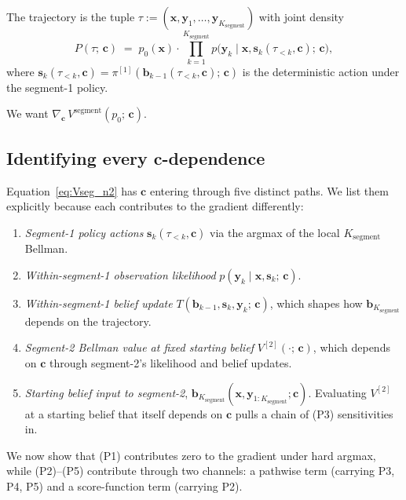 \documentclass[11pt,a4paper]{article}
\newcommand{\bc}{\bm{c}}
\newcommand{\bx}{\bm{x}}
\newcommand{\by}{\bm{y}}
\newcommand{\bs}{\bm{s}}
\newcommand{\bb}{\bm{b}}
\begin{document}
The trajectory is the tuple $\tau := (\bx, \by_1, \ldots, \by_{K_\mathrm{segment}})$ with
joint density
\begin{equation}
P(\tau;\, \bc) \;=\; p_0(\bx) \cdot \prod_{k=1}^{K_\mathrm{segment}} p\bigl(\by_k \mid \bx, \bs_k(\tau_{<k}, \bc);\, \bc\bigr),
\label{eq:trajdensity}
\end{equation}
where $\bs_k(\tau_{<k}, \bc) = \pi^{[1]}(\bb_{k-1}(\tau_{<k}, \bc);\, \bc)$ is the
deterministic action under the segment-1 policy.

We want $\nabla_{\bc}\, V^\mathrm{segment}(p_0;\, \bc)$.

\subsection{Identifying every \texorpdfstring{$\bc$}{c}-dependence}
\label{sec:c_dependences}

Equation~\eqref{eq:Vseg_n2} has $\bc$ entering through five distinct paths.  We list
them explicitly because each contributes to the gradient differently:

\begin{enumerate}[nosep,leftmargin=2em]
\item[(P1)] \emph{Segment-1 policy actions} $\bs_k(\tau_{<k}, \bc)$ via the argmax of the local
      $K_\mathrm{segment}$ Bellman.
\item[(P2)] \emph{Within-segment-1 observation likelihood} $p(\by_k \mid \bx, \bs_k;\, \bc)$.
\item[(P3)] \emph{Within-segment-1 belief update} $T(\bb_{k-1}, \bs_k, \by_k;\, \bc)$, which
      shapes how $\bb_{K_\mathrm{segment}}$ depends on the trajectory.
\item[(P4)] \emph{Segment-2 Bellman value at fixed starting belief}
      $V^{[2]}(\cdot;\, \bc)$, which depends on $\bc$ through segment-2's likelihood and
      belief updates.
\item[(P5)] \emph{Starting belief input to segment-2}, $\bb_{K_\mathrm{segment}}(\bx, \by_{1:K_\mathrm{segment}}; \bc)$.
      Evaluating $V^{[2]}$ at a starting belief that itself depends on $\bc$ pulls a chain
      of (P3) sensitivities in.
\end{enumerate}

We now show that (P1) contributes zero to the gradient under hard argmax, while
(P2)--(P5) contribute through two channels: a pathwise term (carrying P3, P4, P5) and a
score-function term (carrying P2).
\end{document}

